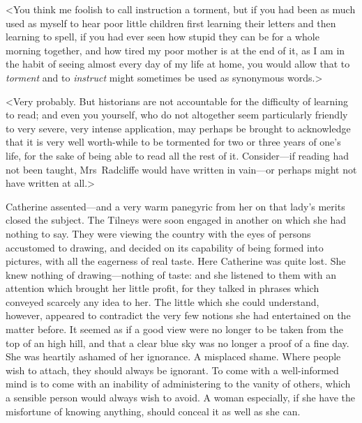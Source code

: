  <You think me foolish to call instruction a torment, but if you had been as much used as myself to hear poor little children first learning their letters and then learning to spell, if you had ever seen how stupid they can be for a whole morning together, and how tired my poor mother is at the end of it, as I am in the habit of seeing almost every day of my life at home, you would allow that to \textit{torment} and to \textit{instruct} might sometimes be used as synonymous words.> 

 <Very probably. But historians are not accountable for the difficulty of learning to read; and even you yourself, who do not altogether seem particularly friendly to very severe, very intense application, may perhaps be brought to acknowledge that it is very well worth-while to be tormented for two or three years of one's life, for the sake of being able to read all the rest of it. Consider—if reading had not been taught, Mrs~Radcliffe would have written in vain—or perhaps might not have written at all.> 

 Catherine assented—and a very warm panegyric from her on that lady's merits closed the subject. The Tilneys were soon engaged in another on which she had nothing to say. They were viewing the country with the eyes of persons accustomed to drawing, and decided on its capability of being formed into pictures, with all the eagerness of real taste. Here Catherine was quite lost. She knew nothing of drawing—nothing of taste: and she listened to them with an attention which brought her little profit, for they talked in phrases which conveyed scarcely any idea to her. The little which she could understand, however, appeared to contradict the very few notions she had entertained on the matter before. It seemed as if a good view were no longer to be taken from the top of an high hill, and that a clear blue sky was no longer a proof of a fine day. She was heartily ashamed of her ignorance. A misplaced shame. Where people wish to attach, they should always be ignorant. To come with a well-informed mind is to come with an inability of administering to the vanity of others, which a sensible person would always wish to avoid. A woman especially, if she have the misfortune of knowing anything, should conceal it as well as she can. 

